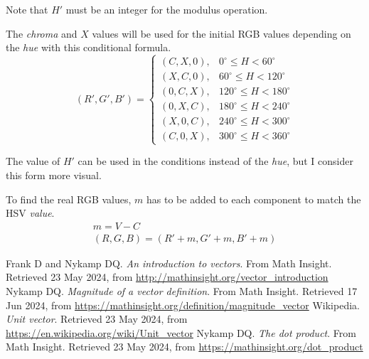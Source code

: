 \documentclass{amsart}
\begin{document}
Note that $H'$ must be an integer for the modulus operation.

The \textit{chroma} and $X$ values will be used for the initial RGB values
depending on the \textit{hue} with this conditional formula.
\begin{equation*}
  \left( R', G', B' \right) =
  \begin{cases}
    (C, X, 0), & 0^\circ \leq H < 60^\circ \\
    (X, C, 0), & 60^\circ \leq H < 120^\circ \\
    (0, C, X), & 120^\circ \leq H < 180^\circ \\
    (0, X, C), & 180^\circ \leq H < 240^\circ \\
    (X, 0, C), & 240^\circ \leq H < 300^\circ \\
    (C, 0, X), & 300^\circ \leq H < 360^\circ
  \end{cases}
\end{equation*}

The value of $H'$ can be used in the conditions instead of the \textit{hue}, but
I consider this form more visual.

To find the real RGB values, $m$ has to be added to each component to match the
HSV \textit{value}.
\begin{gather*}
  m = V - C \\
  (R, G, B) = (R' + m, G' + m, B' + m)
\end{gather*}


\newpage
\begin{thebibliography}{9}
  Frank D and Nykamp DQ. \textit{An introduction to vectors}. From Math
  Insight. Retrieved 23 May 2024, from
  \url{http://mathinsight.org/vector_introduction}
  Nykamp DQ. \textit{Magnitude of a vector definition}. From Math
  Insight. Retrieved 17 Jun 2024, from
  \url{https://mathinsight.org/definition/magnitude_vector}
  Wikipedia. \textit{Unit vector}. Retrieved 23 May 2024, from
  \url{https://en.wikipedia.org/wiki/Unit_vector}
  Nykamp DQ. \textit{The dot product}. From Math Insight. Retrieved 23 May 2024,
  from \url{https://mathinsight.org/dot_product}
\end{thebibliography}
\end{document}

